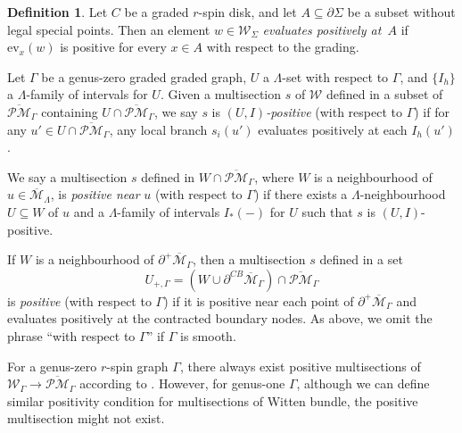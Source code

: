 \documentclass[11pt]{amsart}
\theoremstyle{definition}
\newtheorem{definition}[dummy]{Definition}
\theoremstyle{remark}
\newcommand{\oPMb}{{\overline{\mathcal{PM}}}}
\newcommand{\<}{\left<}
\renewcommand{\>}{\right>}
\numberwithin{equation}{section}
\def\Mbar{{\overline{\mathcal M}}}
\def\ev{\text{ev}}
\begin{document}
\begin{definition}\label{def positive section}
Let $C$ be a graded $r$-spin disk, and let $A \subseteq \partial\Sigma$ be a subset without legal special points.  Then an element $w\in{\mathcal{W}}_\Sigma$ \emph{evaluates positively at~$A$} if $\ev_x(w)$ is positive for every $x\in A$ with respect to the grading.

Let $\Gamma$ be a genus-zero graded graded graph, $U$ a $\Lambda$-set with respect to $\Gamma$, and $\{I_h\}$ a $\Lambda$-family of intervals for $U$.  Given a multisection $s$ of ${\mathcal{W}}$ defined in a subset of $\oPMb_\Gamma$ containing $U\cap\oPMb_\Gamma$, we say $s$ is \emph{$(U,I)$-positive} (with respect to $\Gamma$) if for any $u'\in U\cap \oPMb_\Gamma$, any local branch $s_i(u')$ evaluates positively at each $I_h(u')$.

We say a multisection $s$ defined in $W\cap\oPMb_\Gamma$, where $W$ is a neighbourhood of $u\in\Mbar_\Lambda$, is \emph{positive near} $u$ (with respect to $\Gamma$) if there exists a $\Lambda$-neighbourhood $U\subseteq W$ of $u$ and a $\Lambda$-family of intervals $I_*(-)$ for $U$ such that $s$ is $(U,I)$-positive.

If $W$ is a neighbourhood of $\partial^+\Mbar_\Gamma$, then a multisection $s$ defined in a set
\begin{equation}\label{eq U_+}
U_{+,\Gamma}=\left(W\cup \partial^{CB}\Mbar_{\Gamma}\right)\cap\oPMb_\Gamma
\end{equation}
is \emph{positive} (with respect to $\Gamma$) if it is positive near each point of $\partial^+\Mbar_\Gamma$ and evaluates positively at the contracted boundary nodes.  As above, we %
omit the phrase ``with respect to $\Gamma$'' if $\Gamma$ is smooth.
\end{definition}

For a genus-zero $r$-spin graph $\Gamma$, there always exist %
positive multisections of $\mathcal W_{\Gamma}\to \oPMb_{\Gamma}$ according to \cite[Proposition 3.20]{BCT2}. However, for genus-one $\Gamma$, although we can define similar positivity condition for multisections of Witten bundle, the positive multisection might not exist.
\end{document}
